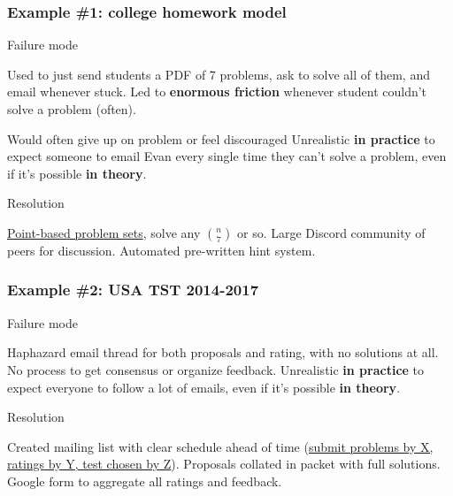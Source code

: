 \documentclass[10pt]{beamer}
\begin{document}
\begin{frame}
  \frametitle{Example \#1: college homework model}
  \begin{alertblock}{Failure mode}
    \begin{itemize}
      \ii Used to just send students a PDF of 7 problems,
      ask to solve all of them, and email whenever stuck.
      \ii Led to \textbf{enormous friction}
      whenever student couldn't solve a problem (often).
      \begin{itemize}
        \ii Would often give up on problem or feel discouraged
        \ii Unrealistic \textbf{in practice}
        to expect someone to email Evan every single time
        they can't solve a problem,
        even if it's possible \textbf{in theory}.
      \end{itemize}
    \end{itemize}
  \end{alertblock}
  \pause
  \begin{exampleblock}{Resolution}
    \begin{itemize}
      \ii \href{https://blog.evanchen.cc/2018/03/27/i-switched-to-point-based-problem-sets/}{Point-based problem sets},
      solve any $\binom n7$ or so.
      \ii Large Discord community of peers for discussion.
      \ii Automated pre-written hint system.
    \end{itemize}
  \end{exampleblock}
\end{frame}

\begin{frame}
  \frametitle{Example \#2: USA TST 2014-2017}
  \begin{alertblock}{Failure mode}
    \begin{itemize}
      \ii Haphazard email thread for both proposals and rating,
      with no solutions at all.
      \ii No process to get consensus or organize feedback.
      \ii Unrealistic \textbf{in practice} to expect
      everyone to follow a lot of emails,
      even if it's possible \textbf{in theory}.
    \end{itemize}
  \end{alertblock}
  \pause
  \begin{exampleblock}{Resolution}
    \begin{itemize}
      \ii Created mailing list with clear schedule ahead of time
      (\href{https://blog.evanchen.cc/2020/12/16/usemo-problem-development-behind-the-scenes/}{submit problems by X, ratings by Y, test chosen by Z}).
      \ii Proposals collated in packet with full solutions.
      \ii Google form to aggregate all ratings and feedback.
    \end{itemize}
  \end{exampleblock}
\end{frame}
\end{document}
